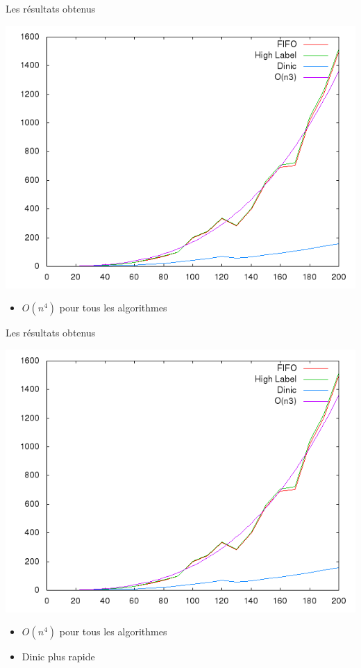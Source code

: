 \documentclass[hyperref={},
xcolor={dvipsnames,svgnames,table},10pt]{beamer}
\begin{document}
\begin{frame}{Les résultats obtenus}
	\begin{minipage}[c]{0.50\linewidth}
		\includegraphics[scale=0.3]{img/resultat.png}
	\end{minipage}\hfill
	\begin{minipage}[c]{0.40\linewidth}
		\begin{itemize}
			\item $O(n^4)$ pour tous les algorithmes
		\end{itemize}
	\end{minipage}
\end{frame}

\begin{frame}{Les résultats obtenus}
	\begin{minipage}[c]{0.50\linewidth}
		\includegraphics[scale=0.3]{img/resultat.png}
	\end{minipage}\hfill
	\begin{minipage}[c]{0.40\linewidth}
		\begin{itemize}
			\item $O(n^4)$ pour tous les algorithmes
			\item Dinic plus rapide
		\end{itemize}
	\end{minipage}
\end{frame}
\end{document}
